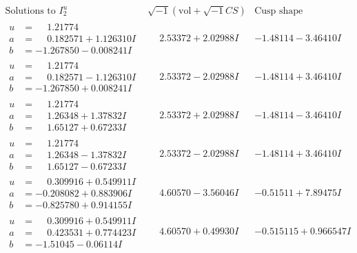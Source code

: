 \documentclass[1p]{elsarticle_modified}
\theoremstyle{definition}
\newcommand{\I}{\sqrt{-1}}
\begin{document}
$$\begin{array}{c|c|c}  
\text{Solutions to }I^u_{2}& \I (\text{vol} + \sqrt{-1}CS) & \text{Cusp shape}\\
 \hline 
\begin{aligned}
u &= \phantom{-}1.21774\phantom{ +0.000000I} \\
a &= \phantom{-}0.182571 + 1.126310 I \\
b &= -1.267850 - 0.008241 I\end{aligned}
 & \phantom{-}2.53372 + 2.02988 I & -1.48114 - 3.46410 I \\ \hline\begin{aligned}
u &= \phantom{-}1.21774\phantom{ +0.000000I} \\
a &= \phantom{-}0.182571 - 1.126310 I \\
b &= -1.267850 + 0.008241 I\end{aligned}
 & \phantom{-}2.53372 - 2.02988 I & -1.48114 + 3.46410 I \\ \hline\begin{aligned}
u &= \phantom{-}1.21774\phantom{ +0.000000I} \\
a &= \phantom{-}1.26348 + 1.37832 I \\
b &= \phantom{-}1.65127 + 0.67233 I\end{aligned}
 & \phantom{-}2.53372 + 2.02988 I & -1.48114 - 3.46410 I \\ \hline\begin{aligned}
u &= \phantom{-}1.21774\phantom{ +0.000000I} \\
a &= \phantom{-}1.26348 - 1.37832 I \\
b &= \phantom{-}1.65127 - 0.67233 I\end{aligned}
 & \phantom{-}2.53372 - 2.02988 I & -1.48114 + 3.46410 I \\ \hline\begin{aligned}
u &= \phantom{-}0.309916 + 0.549911 I \\
a &= -0.208082 + 0.883906 I \\
b &= -0.825780 + 0.914155 I\end{aligned}
 & \phantom{-}4.60570 - 3.56046 I & -0.51511 + 7.89475 I \\ \hline\begin{aligned}
u &= \phantom{-}0.309916 + 0.549911 I \\
a &= \phantom{-}0.423531 + 0.774423 I \\
b &= -1.51045 - 0.06114 I\end{aligned}
 & \phantom{-}4.60570 + 0.49930 I & -0.515115 + 0.966547 I \\ \hline\begin{aligned}

\end{aligned}
\end{array}$$
\end{document}

